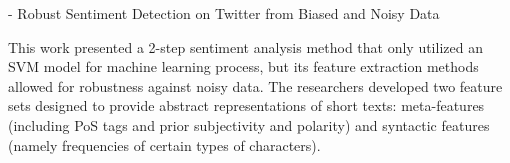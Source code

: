 \documentclass[12pt]{diazessay} %
\begin{document}
- Robust Sentiment Detection on Twitter from Biased and Noisy Data \citep{barbosa2010}

This work presented a 2-step sentiment analysis method that only utilized an SVM model for machine learning process, but its feature extraction methods allowed for robustness against noisy data. The researchers developed two feature sets designed to provide abstract representations of short texts: meta-features (including PoS tags and prior subjectivity and polarity) and syntactic features (namely frequencies of certain types of characters). 



\citep{devlin2018bert}






\end{document}
